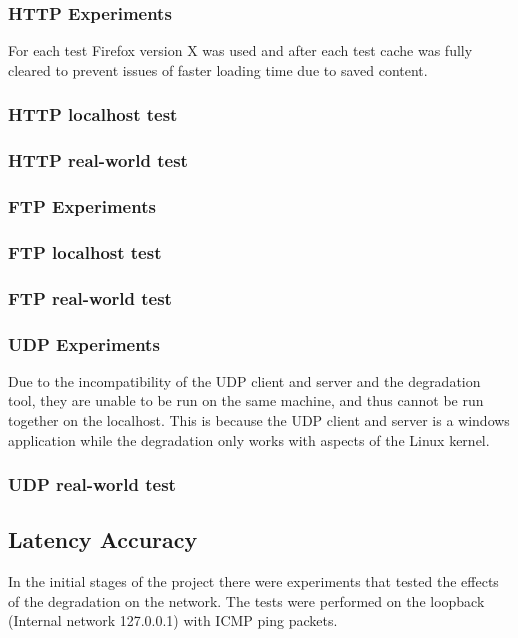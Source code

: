 \subsubsection{HTTP Experiments}
For each test Firefox version X was used and after each test cache was fully cleared to prevent issues of faster loading time due to saved content.

\subsubsection*{HTTP localhost test}

\subsubsection*{HTTP real-world test}

\subsubsection{FTP Experiments}

\subsubsection*{FTP localhost test}

\subsubsection*{FTP real-world test}

\subsubsection{UDP Experiments}
Due to the incompatibility of the UDP client and server and the degradation tool, they are unable to be run on the same machine, and thus cannot be run together on the localhost. This is because the UDP client and server is a windows application while the degradation only works with aspects of the Linux kernel.

\subsubsection*{UDP real-world test}


\subsection{Latency Accuracy}
In the initial stages of the project there were experiments that tested the effects of the degradation on the network. The tests were performed on the loopback (Internal network 127.0.0.1) with ICMP ping packets.

